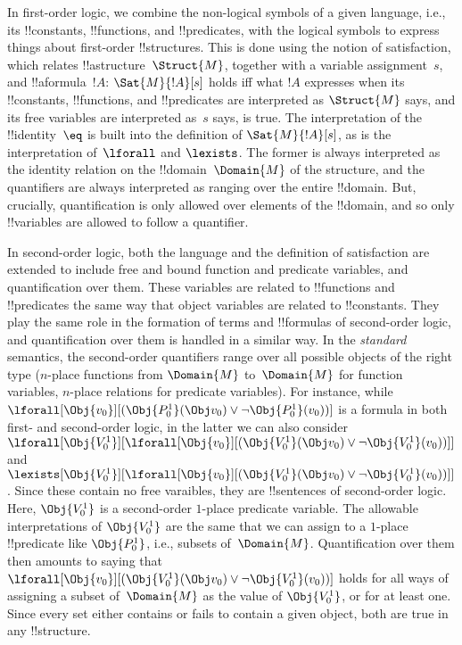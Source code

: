 \documentclass[../../../include/open-logic-section]{subfiles}
\begin{document}


In first-order logic, we combine the non-logical symbols of a given
language, i.e., its !!{constant}s, !!{function}s, and !!{predicate}s,
with the logical symbols to express things about first-order
!!{structure}s.  This is done using the notion of satisfaction, which
relates !!a{structure}~$\Struct{M}$, together with a variable
assignment~$s$, and !!a{formula}~$!A$: $\Sat{M}{!A}[s]$ holds iff what
$!A$ expresses when its !!{constant}s, !!{function}s, and
!!{predicate}s are interpreted as $\Struct{M}$ says, and its free
variables are interpreted as~$s$ says, is true.  The interpretation of
the !!{identity}~$\eq$ is built into the definition of
$\Sat{M}{!A}[s]$, as is the interpretation of~$\lforall$ and
$\lexists$. The former is always interpreted as the identity relation
on the !!{domain}~$\Domain{M}$ of the structure, and the quantifiers
are always interpreted as ranging over the entire !!{domain}.  But,
crucially, quantification is only allowed over elements of the
!!{domain}, and so only !!{variable}s are allowed to follow a
quantifier.

In second-order logic, both the language and the definition of
satisfaction are extended to include free and bound function and
predicate variables, and quantification over them.  These variables
are related to !!{function}s and !!{predicate}s the same way that
object variables are related to !!{constant}s.  They play the same
role in the formation of terms and !!{formula}s of second-order logic,
and quantification over them is handled in a similar way.  In the
\emph{standard} semantics, the second-order quantifiers range over all
possible objects of the right type ($n$-place functions from
$\Domain{M}$ to~$\Domain{M}$ for function variables, $n$-place
relations for predicate variables).  For instance, while
$\lforall[\Obj{v_0}][(\Obj{P^1_0}(\Obj v_0) \lor \lnot
  \Obj{P^1_0}(v_0))]$ is a formula in both first- and second-order
logic, in the latter we can also consider
$\lforall[\Obj{V^1_0}][\lforall[\Obj{v_0}][(\Obj{V^1_0}(\Obj v_0) \lor
    \lnot \Obj{V^1_0}(v_0))]]$ and
$\lexists[\Obj{V^1_0}][\lforall[\Obj{v_0}][(\Obj{V^1_0}(\Obj v_0) \lor
    \lnot \Obj{V^1_0}(v_0))]]$. Since these contain no free varaibles,
they are !!{sentence}s of second-order logic. Here, $\Obj{V^1_0}$ is a
second-order $1$-place predicate variable.  The allowable
interpretations of $\Obj{V^1_0}$ are the same that we can assign to a
$1$-place !!{predicate} like $\Obj{P^1_0}$, i.e., subsets
of~$\Domain{M}$.  Quantification over them then amounts to saying that
$\lforall[\Obj{v_0}][(\Obj{V^1_0}(\Obj v_0) \lor \lnot
  \Obj{V^1_0}(v_0))]$ holds for all ways of assigning a subset
of~$\Domain{M}$ as the value of $\Obj{V^1_0}$, or for at least one.
Since every set either contains or fails to contain a given object,
both are true in any !!{structure}.
\end{document}
